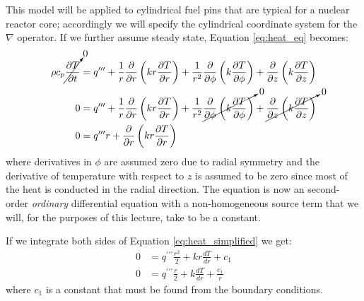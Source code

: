 This model will be applied to cylindrical fuel pins that are typical for a nuclear reactor core; accordingly we will specify the cylindrical coordinate system for the $\nabla$ operator.  If we further assume steady state, Equation \ref{eq:heat_eq} becomes:
\begin{align}
\rho c_p  \cancelto{0}{\frac{\partial T}{\partial t}} &= q^{\prime \prime \prime} + \frac{1}{r} \frac{\partial}{\partial r}\left(k r \frac{\partial T}{\partial r}\right)+ \frac{1}{r^2} \frac{\partial}{\partial \phi} \left(k \frac{\partial T}{\partial \phi} \right) + \frac{\partial}{\partial z}\left(k \frac{\partial T}{\partial z} \right) \nonumber \\
0 &= q^{\prime \prime \prime} + \frac{1}{r} \frac{\partial}{\partial r}\left(k r \frac{\partial T}{\partial r}\right)+ \frac{1}{r^2} \cancelto{0}{\frac{\partial}{\partial \phi} \left(k \frac{\partial T}{\partial \phi} \right)} + \cancelto{0}{\frac{\partial}{\partial z}\left(k \frac{\partial T}{\partial z} \right)} \nonumber \\
0 &= q^{\prime \prime \prime} r + \frac{\partial}{\partial r} \left(kr \frac{\partial T}{\partial r} \right)
\label{eq:heat_simplified}
\end{align}
where derivatives in $\phi$ are assumed zero due to radial symmetry and the derivative of temperature with respect to $z$ is assumed to be zero since most of the heat is conducted in the radial direction.  The equation is now an second-order \emph{ordinary} differential equation with a non-homogeneous source term that we will, for the purposes of this lecture, take to be a constant.  

If we integrate both sides of Equation \ref{eq:heat_simplified} we get:
\begin{align}
0 &= q^{\prime \prime \prime} \frac{r^2}{2} + kr\frac{dT}{dr} + c_1 \nonumber \\
0 &= q^{\prime \prime \prime} \frac{r}{2} + k\frac{dT}{dr} + \frac{c_1}{r} 
\label{eq:heat_simplified2}
\end{align}
where $c_1$ is a constant that must be found from the boundary conditions. 


